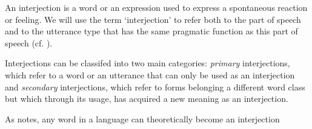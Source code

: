 An interjection is a word or an expression used to express a spontaneous reaction or feeling. We will use the term `interjection' to refer both to the part of speech and to the utterance type that has the same pragmatic function as this part of speech (cf. \cite{ameka1992}).

Interjections can be classifed into two main categories: \emph{primary} interjections, which refer to a word or an utterance that can only be used as an interjection and \emph{secondary} interjections, which refer to forms belonging a different word class but which through its usage, has acquired a new meaning as an interjection.

As \textcite{jovanovic2004} notes, any word in a language can theoretically become an interjection
